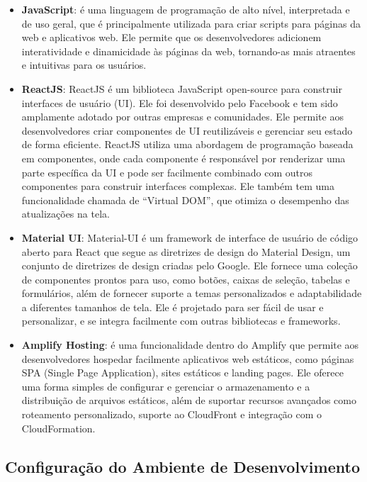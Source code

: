 \begin{itemize} \label{itemize:cliente_production}
    \item \textbf{JavaScript}: é uma linguagem de programação de alto nível, interpretada e de uso geral, que é principalmente utilizada para criar scripts para páginas da web e aplicativos web. Ele permite que os desenvolvedores adicionem interatividade e dinamicidade às páginas da web, tornando-as mais atraentes e intuitivas para os usuários.
    \item \textbf{ReactJS}: ReactJS é um biblioteca JavaScript open-source para construir interfaces de usuário (UI). Ele foi desenvolvido pelo Facebook e tem sido amplamente adotado por outras empresas e comunidades. Ele permite aos desenvolvedores criar componentes de UI reutilizáveis e gerenciar seu estado de forma eficiente. ReactJS utiliza uma abordagem de programação baseada em componentes, onde cada componente é responsável por renderizar uma parte específica da UI e pode ser facilmente combinado com outros componentes para construir interfaces complexas. Ele também tem uma funcionalidade chamada de ``Virtual DOM'', que otimiza o desempenho das atualizações na tela.
    \item \textbf{Material UI}: Material-UI é um framework de interface de usuário de código aberto para React que segue as diretrizes de design do Material Design, um conjunto de diretrizes de design criadas pelo Google. Ele fornece uma coleção de componentes prontos para uso, como botões, caixas de seleção, tabelas e formulários, além de fornecer suporte a temas personalizados e adaptabilidade a diferentes tamanhos de tela. Ele é projetado para ser fácil de usar e personalizar, e se integra facilmente com outras bibliotecas e frameworks.
    \item \textbf{Amplify Hosting}: é uma funcionalidade dentro do Amplify que permite aos desenvolvedores hospedar facilmente aplicativos web estáticos, como páginas SPA (Single Page Application), sites estáticos e landing pages. Ele oferece uma forma simples de configurar e gerenciar o armazenamento e a distribuição de arquivos estáticos, além de suportar recursos avançados como roteamento personalizado, suporte ao CloudFront e integração com o CloudFormation.
\end{itemize}

\subsection{Configuração do Ambiente de Desenvolvimento}

